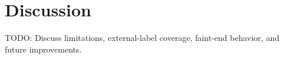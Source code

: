 \section{Discussion}

TODO: Discuss limitations, external-label coverage, faint-end behavior, and future improvements.

